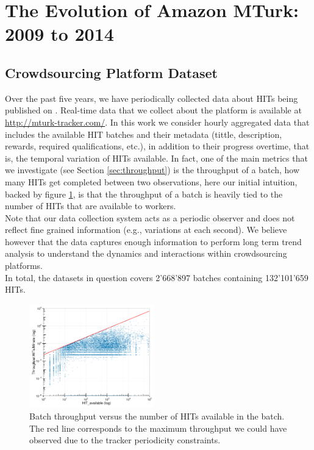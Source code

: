 \section{The Evolution of Amazon MTurk: 2009 to 2014}\label{sec:stats}


\subsection{Crowdsourcing Platform Dataset}
\label{sec:tracker}
Over the past five years, we have periodically collected data about HITs being published on \amt{}.
Real-time data that we collect about the platform is available at \url{http://mturk-tracker.com/}. In this work we consider hourly aggregated data that includes the available HIT batches and their metadata (tittle, description, rewards, required qualifications, etc.), in addition to their progress overtime, that is, the temporal variation of HITs available. In fact, one of the main metrics that we investigate (see Section \ref{sec:throughput}) is the throughput of a batch, how many HITs  get completed between two observations, here our initial intuition, backed by figure \ref{fig:motiv}, is that the throughput of a batch is heavily tied to the number of HITs that are available to workers.\\
Note that our data collection system acts  as a periodic observer and does not reflect fine grained information (e.g., variations at each second). We believe however that the data captures enough information to perform long term trend analysis to understand the dynamics and interactions within crowdsourcing platforms.\\

In total, the datasets in question covers 2'668'897 batches containing 132'101'659 HITs.

\begin{figure}[ht]
	\centering
		\includegraphics[width=0.48\textwidth]{figures/motiv_mturk}
	\caption{Batch throughput versus the number of HITs available in the batch. The red line corresponds to the maximum throughput we could have observed due to the tracker periodicity constraints.\protect\footnotemark}
	\label{fig:motiv}
\end{figure}

